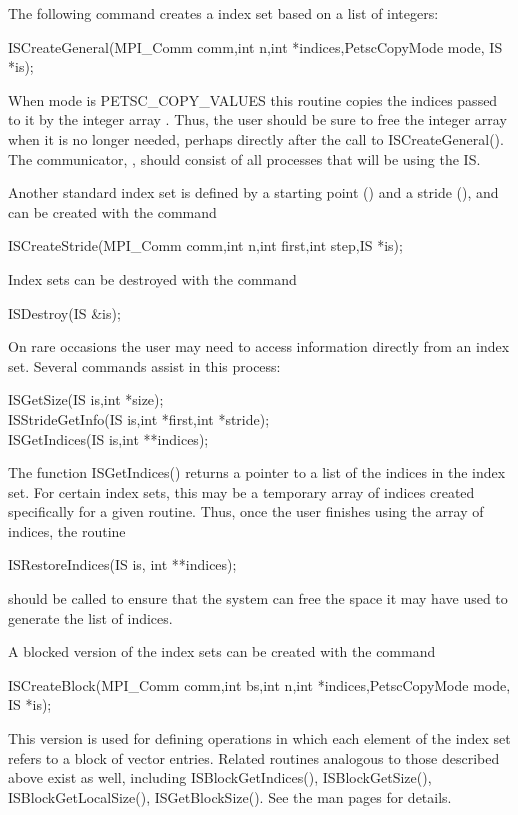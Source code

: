 The following command creates a index set based on a list 
of integers: 
\begin{tabbing}
  ISCreateGeneral(MPI\_Comm comm,int n,int *indices,PetscCopyMode mode, IS *is);
\end{tabbing}
When mode is PETSC\_COPY\_VALUES this routine copies the  indices passed 
to it by the integer array .  
Thus, the user should be sure to free the integer array  
when it is no longer needed, perhaps directly after the call to 
ISCreateGeneral(). The communicator, , should consist of all 
processes that will be using the IS.

Another standard index set is defined by a starting point () and a
stride (),  and can be created with the command
\begin{tabbing}
  ISCreateStride(MPI\_Comm comm,int n,int first,int step,IS *is);
\end{tabbing}

Index sets can be destroyed with the command 
\begin{tabbing}
  ISDestroy(IS \&is); 
\end{tabbing}

On rare occasions the user may need to access information directly 
from an index set. 
Several commands 
assist in this process:
\begin{tabbing}
  ISGetSize(IS is,int *size);\\
  ISStrideGetInfo(IS is,int *first,int *stride);\\
  ISGetIndices(IS is,int **indices);
\end{tabbing}
The function ISGetIndices() returns a pointer to a list of the 
indices in the index set. 
For certain index sets, this may be a 
temporary array of indices created specifically for a given routine. 
Thus, once the user finishes using the array of indices, 
the routine 
\begin{tabbing}
  ISRestoreIndices(IS is, int **indices); 
\end{tabbing}
should be called to ensure that the system can free the space it 
may have used to generate the list of indices.

A blocked version of the index sets can be created with the command
\begin{tabbing}
  ISCreateBlock(MPI\_Comm comm,int bs,int n,int *indices,PetscCopyMode mode, IS *is);
\end{tabbing}
This version is used for defining operations in which each element of the index
set refers to a block of  vector entries.  Related routines analogous
to those described above exist as well, including
ISBlockGetIndices(), ISBlockGetSize(), ISBlockGetLocalSize(), ISGetBlockSize().
See the man pages for details.

